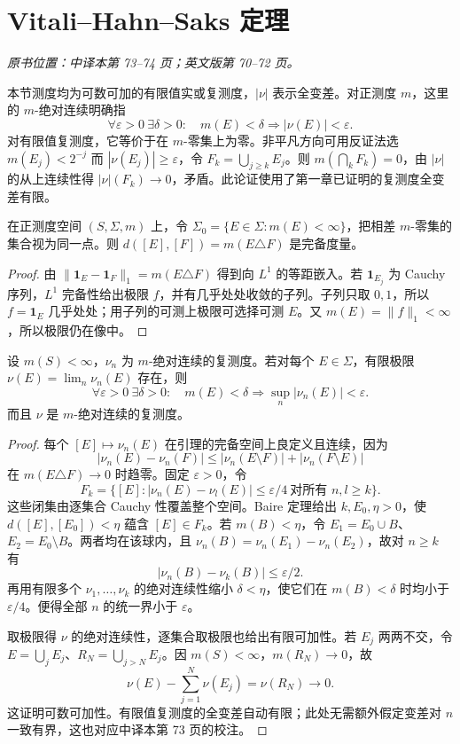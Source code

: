 \section{Vitali--Hahn--Saks 定理}\label{sec:yosida-02-02}
\noindent\textit{原书位置：中译本第 73--74 页；英文版第 70--72 页。}

本节测度均为可数可加的有限值实或复测度，$|\nu|$ 表示全变差。对正测度 $m$，这里的 $m$-绝对连续明确指
\[
 \forall\varepsilon>0\ \exists\delta>0:\quad m(E)<\delta\Longrightarrow|\nu(E)|<\varepsilon.
\]
对有限值复测度，它等价于在 $m$-零集上为零。非平凡方向可用反证法选 $m(E_j)<2^{-j}$ 而 $|\nu(E_j)|\ge\varepsilon$，令 $F_k=\bigcup_{j\ge k}E_j$。则 $m(\bigcap_kF_k)=0$，由 $|\nu|$ 的从上连续性得 $|\nu|(F_k)\to0$，矛盾。此论证使用了第一章已证明的复测度全变差有限。

\begin{lemma}[集合空间的完备性]\label{lem:y2-measure-algebra}
在正测度空间 $(S,\Sigma,m)$ 上，令 $\Sigma_0=\{E\in\Sigma:m(E)<\infty\}$，把相差 $m$-零集的集合视为同一点。则 $d([E],[F])=m(E\triangle F)$ 是完备度量。
\end{lemma}
\begin{proof}
由 $\|\mathbf1_E-\mathbf1_F\|_1=m(E\triangle F)$ 得到向 $L^1$ 的等距嵌入。若 $\mathbf1_{E_j}$ 为 Cauchy 序列，$L^1$ 完备性给出极限 $f$，并有几乎处处收敛的子列。子列只取 $0,1$，所以 $f=\mathbf1_E$ 几乎处处；用子列的可测上极限可选择可测 $E$。又 $m(E)=\|f\|_1<\infty$，所以极限仍在像中。
\end{proof}

\begin{theorem}\label{thm:y2-vhs}
设 $m(S)<\infty$，$\nu_n$ 为 $m$-绝对连续的复测度。若对每个 $E\in\Sigma$，有限极限 $\nu(E)=\lim_n\nu_n(E)$ 存在，则
\[
 \forall\varepsilon>0\ \exists\delta>0:\quad
 m(E)<\delta\Longrightarrow\sup_n|\nu_n(E)|<\varepsilon.
\]
而且 $\nu$ 是 $m$-绝对连续的复测度。
\end{theorem}
\begin{proof}
每个 $[E]\mapsto\nu_n(E)$ 在引理的完备空间上良定义且连续，因为
\[
 |\nu_n(E)-\nu_n(F)|\le|\nu_n(E\setminus F)|+|\nu_n(F\setminus E)|
\]
在 $m(E\triangle F)\to0$ 时趋零。固定 $\varepsilon>0$，令
\[
 F_k=\{[E]:|\nu_n(E)-\nu_l(E)|\le\varepsilon/4\ \text{对所有 }n,l\ge k\}.
\]
这些闭集由逐集合 Cauchy 性覆盖整个空间。Baire 定理给出 $k,E_0,\eta>0$，使 $d([E],[E_0])<\eta$ 蕴含 $[E]\in F_k$。若 $m(B)<\eta$，令 $E_1=E_0\cup B$、$E_2=E_0\setminus B$。两者均在该球内，且 $\nu_n(B)=\nu_n(E_1)-\nu_n(E_2)$，故对 $n\ge k$ 有
\[
 |\nu_n(B)-\nu_k(B)|\le\varepsilon/2.
\]
再用有限多个 $\nu_1,\ldots,\nu_k$ 的绝对连续性缩小 $\delta<\eta$，使它们在 $m(B)<\delta$ 时均小于 $\varepsilon/4$。便得全部 $n$ 的统一界小于 $\varepsilon$。

取极限得 $\nu$ 的绝对连续性，逐集合取极限也给出有限可加性。若 $E_j$ 两两不交，令 $E=\bigcup_jE_j$、$R_N=\bigcup_{j>N}E_j$。因 $m(S)<\infty$，$m(R_N)\to0$，故
\[
 \nu(E)-\sum_{j=1}^N\nu(E_j)=\nu(R_N)\longrightarrow0.
\]
这证明可数可加性。有限值复测度的全变差自动有限；此处无需额外假定变差对 $n$ 一致有界，这也对应中译本第 73 页的校注。
\end{proof}

